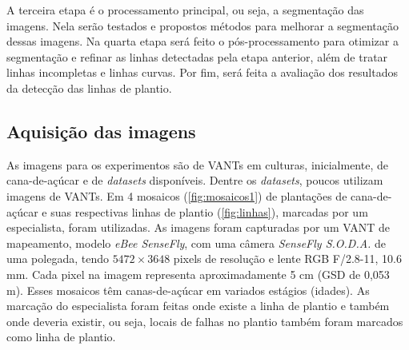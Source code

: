 \documentclass[12pt, a4paper, english, brazil]{article}
\begin{document}
A terceira etapa é o processamento principal, ou seja, a segmentação das imagens. Nela serão testados e propostos métodos para melhorar a segmentação dessas imagens. Na quarta etapa será feito o pós-processamento para otimizar a segmentação e refinar as linhas detectadas pela etapa anterior, além de tratar linhas incompletas e linhas curvas. Por fim, será feita a avaliação dos resultados da detecção das linhas de plantio.

\subsection{Aquisição das imagens}

As imagens para os experimentos são de VANTs em culturas, inicialmente, de cana-de-açúcar e de \textit{datasets} disponíveis. Dentre os \textit{datasets}, poucos utilizam imagens de VANTs. Em  4 mosaicos (\autoref{fig:mosaicos1}) de plantações de cana-de-açúcar e suas respectivas linhas de plantio (\autoref{fig:linhas}), marcadas por um especialista, foram utilizadas. As imagens foram capturadas por um VANT de mapeamento, modelo \textit{eBee SenseFly}, com uma câmera \textit{SenseFly S.O.D.A.} de uma polegada, tendo $5472\times3648$ pixels de resolução e lente RGB F/2.8-11, 10.6 mm. Cada pixel na imagem representa aproximadamente 5 cm (GSD de 0,053 m). Esses mosaicos têm canas-de-açúcar em variados estágios (idades). As marcação do especialista foram feitas onde existe a linha de plantio e também onde deveria existir, ou seja, locais de falhas no plantio também foram marcados como linha de plantio.
\end{document}
